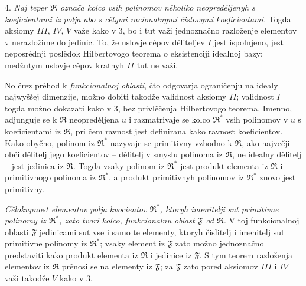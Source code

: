 \documentclass[11pt]{article}
\providecommand{\mR}{\mathfrak{R}}
\providecommand{\mF}{\mathfrak{F}}
\begin{document}
4. {\itshape Naj teper $\mR$ označa kolco vsih polinomov několiko neopreděljenyh s koeficientami iz polja abo s cělymi racionalnymi čislovymi koeficientami.} Togda aksiomy $III$, $IV$, $V$ važe kako v 3, bo i tut važi jednoznačno razloženje elementov v nerazložime do jedinic. To, že uslovje cěpov děliteljev $I$ jest ispolnjeno, jest neposrědnji poslědok Hilbertovogo teorema o eksistenciji idealnoj bazy; medžutym uslovje cěpov kratnyh $II$ tut ne važi.

No črez prěhod k \emph{funkcionalnoj oblasti}, čto odgovarja ograničenju na idealy najwyššej dimenzije, možno dobiti takodže validnost aksiomy $II$; validnost $I$ togda možno dokazati kako v 3, bez privlěčenja Hilbertovogo teorema. Imenno, adjunguje se k $\mR$ neopreděljena $u$ i razmatrivaje se kolco $\mR^*$ vsih polinomov v $u$ s koeficientami iz $\mR$, pri čem ravnost jest definirana kako ravnost koeficientov. Kako obyčno, polinom iz $\mR^*$ nazyvaje se primitivny vzhodno k $\mR$, ako največji obči dělitelj jego koeficientov -- dělitelj v smyslu polinoma iz $\mR$, ne idealny dělitelj -- jest jedinica iz $\mR$. Togda vsaky polinom iz $\mR^*$ jest produkt elementa iz $\mR$ i primitivnogo polinoma iz $\mR^*$, a produkt primitivnyh polinomov iz $\mR^*$ znovo jest primitivny.

\emph{Cělokupnost elementov polja kvocientov $\mR^*$, ktoryh imenitelji sut primitivne polinomy iz $\mR^*$, zato tvori kolco, funkcionalnu oblast $\mF$ od $\mR$.} V toj funkcionalnoj oblasti $\mF$ jedinicami sut vse i samo te elementy, ktoryh čislitelj i imenitelj sut primitivne polinomy iz $\mR^*$; vsaky element iz $\mF$ zato možno jednoznačno predstaviti kako produkt elementa iz $\mR$ i jedinice iz $\mF$. S tym teorem razloženja elementov iz $\mR$ prěnosi se na elementy iz $\mF$; za $\mF$ zato pored aksiomov $III$ i $IV$ važi takodže $V$ kako v 3.
\end{document}
